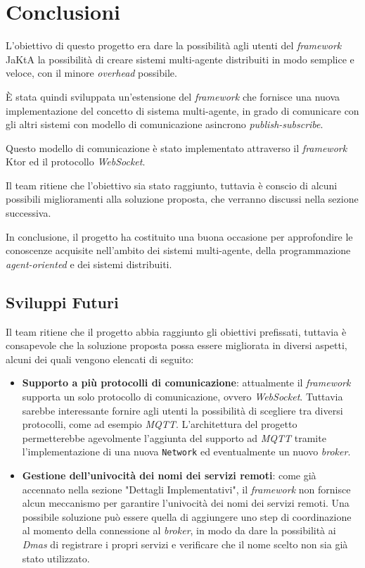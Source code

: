 \section{Conclusioni}
L'obiettivo di questo progetto era dare la possibilità agli utenti del \textit{framework} JaKtA la possibilità di creare sistemi multi-agente distribuiti in modo semplice e veloce, con il minore \textit{overhead} possibile.

È stata quindi sviluppata un'estensione del \textit{framework} che fornisce una nuova implementazione del concetto di sistema multi-agente, in grado di comunicare con gli altri sistemi con modello di comunicazione asincrono \textit{publish-subscribe}.

Questo modello di comunicazione è stato implementato attraverso il \textit{framework} Ktor ed il protocollo \textit{WebSocket}.

Il team ritiene che l'obiettivo sia stato raggiunto, tuttavia è conscio di alcuni possibili miglioramenti alla soluzione proposta, che verranno discussi nella sezione successiva.

In conclusione, il progetto ha costituito una buona occasione per approfondire le conoscenze acquisite nell'ambito dei sistemi multi-agente, della programmazione \textit{agent-oriented} e dei sistemi distribuiti.


\subsection{Sviluppi Futuri}
Il team ritiene che il progetto abbia raggiunto gli obiettivi prefissati, tuttavia è consapevole che la soluzione proposta possa essere migliorata in diversi aspetti, alcuni dei quali vengono elencati di seguito:

\begin{itemize}
    \item \textbf{Supporto a più protocolli di comunicazione}: attualmente il \textit{framework} supporta un solo protocollo di comunicazione, ovvero \textit{WebSocket}. Tuttavia sarebbe interessante
    fornire agli utenti la possibilità di scegliere tra diversi protocolli, come ad esempio \textit{MQTT}. L'architettura del progetto permetterebbe agevolmente l'aggiunta del supporto ad \textit{MQTT}
    tramite l'implementazione di una nuova \texttt{Network} ed eventualmente un nuovo \textit{broker}.
    \item \textbf{Gestione dell'univocità dei nomi dei servizi remoti}: come già accennato nella sezione "Dettagli Implementativi", il \textit{framework} non fornisce alcun meccanismo per garantire
    l'univocità dei nomi dei servizi remoti. Una possibile soluzione può essere quella di aggiungere uno step di coordinazione al momento della connessione al \textit{broker}, in modo da dare la possibilità ai
    \textit{Dmas} di registrare i propri servizi e verificare che il nome scelto non sia già stato utilizzato.
\end{itemize}
